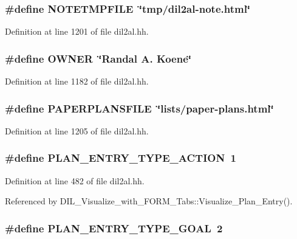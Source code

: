 \subsubsection{\setlength{\rightskip}{0pt plus 5cm}\#define NOTETMPFILE\ \char`\"{}tmp/dil2al-note.html\char`\"{}}\label{dil2al_8hh_a54}




Definition at line 1201 of file dil2al.hh.
\subsubsection{\setlength{\rightskip}{0pt plus 5cm}\#define OWNER\ \char`\"{}Randal A. Koene\char`\"{}}\label{dil2al_8hh_a36}




Definition at line 1182 of file dil2al.hh.
\subsubsection{\setlength{\rightskip}{0pt plus 5cm}\#define PAPERPLANSFILE\ \char`\"{}lists/paper-plans.html\char`\"{}}\label{dil2al_8hh_a58}




Definition at line 1205 of file dil2al.hh.
\subsubsection{\setlength{\rightskip}{0pt plus 5cm}\#define PLAN\_\-ENTRY\_\-TYPE\_\-ACTION\ 1}\label{dil2al_8hh_a11}




Definition at line 482 of file dil2al.hh.

Referenced by DIL\_\-Visualize\_\-with\_\-FORM\_\-Tabs::Visualize\_\-Plan\_\-Entry().
\subsubsection{\setlength{\rightskip}{0pt plus 5cm}\#define PLAN\_\-ENTRY\_\-TYPE\_\-GOAL\ 2}\label{dil2al_8hh_a12}





